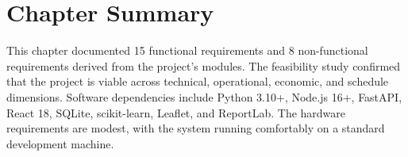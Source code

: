 \section{Chapter Summary}
\label{sec:ch4_summary}

This chapter documented 15 functional requirements and 8 non-functional requirements derived from the project's modules. The feasibility study confirmed that the project is viable across technical, operational, economic, and schedule dimensions. Software dependencies include Python 3.10+, Node.js 16+, FastAPI, React 18, SQLite, scikit-learn, Leaflet, and ReportLab. The hardware requirements are modest, with the system running comfortably on a standard development machine.
